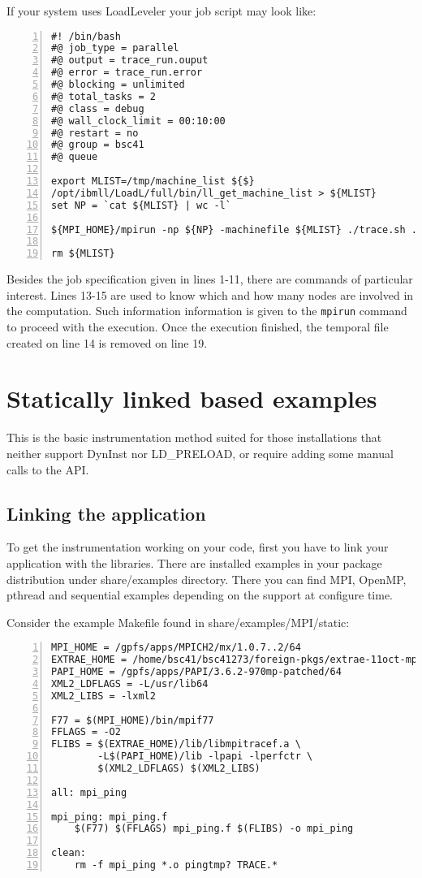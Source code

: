 If your system uses LoadLeveler your job script may look like:

\begin{Verbatim}[frame=single,numbers=left,labelposition=topline,label=ll.sh]
#! /bin/bash
#@ job_type = parallel
#@ output = trace_run.ouput
#@ error = trace_run.error
#@ blocking = unlimited
#@ total_tasks = 2
#@ class = debug
#@ wall_clock_limit = 00:10:00
#@ restart = no
#@ group = bsc41 
#@ queue

export MLIST=/tmp/machine_list ${$}
/opt/ibmll/LoadL/full/bin/ll_get_machine_list > ${MLIST}
set NP = `cat ${MLIST} | wc -l`

${MPI_HOME}/mpirun -np ${NP} -machinefile ${MLIST} ./trace.sh ./mpi-app

rm ${MLIST}
\end{Verbatim}

Besides the job specification given in lines 1-11, there are commands of particular interest. Lines 13-15 are used to know which and how many nodes are involved in the computation. Such information information is given to the {\tt mpirun} command to proceed with the execution. Once the execution finished, the temporal file created on line 14 is removed on line 19.

\section{Statically linked based examples}\label{sec:Examples_static}

This is the basic instrumentation method suited for those installations that neither support DynInst nor LD\_PRELOAD, or require adding some manual calls to the \TRACE API.

\subsection{Linking the application}\label{subsec:Examples_static_link}

To get the instrumentation working on your code, first you have to link your application with the \TRACE libraries. There are installed examples in your package distribution under share/examples directory. There you can find MPI, OpenMP, pthread and sequential examples depending on the support at configure time.

Consider the example Makefile found in share/examples/MPI/static:

\begin{Verbatim}[frame=single,numbers=left,labelposition=topline,label=Makefile]
MPI_HOME = /gpfs/apps/MPICH2/mx/1.0.7..2/64
EXTRAE_HOME = /home/bsc41/bsc41273/foreign-pkgs/extrae-11oct-mpich2/64
PAPI_HOME = /gpfs/apps/PAPI/3.6.2-970mp-patched/64
XML2_LDFLAGS = -L/usr/lib64
XML2_LIBS = -lxml2

F77 = $(MPI_HOME)/bin/mpif77 
FFLAGS = -O2
FLIBS = $(EXTRAE_HOME)/lib/libmpitracef.a \
        -L$(PAPI_HOME)/lib -lpapi -lperfctr \
        $(XML2_LDFLAGS) $(XML2_LIBS)

all: mpi_ping

mpi_ping: mpi_ping.f
	$(F77) $(FFLAGS) mpi_ping.f $(FLIBS) -o mpi_ping

clean:
	rm -f mpi_ping *.o pingtmp? TRACE.*
\end{Verbatim}

